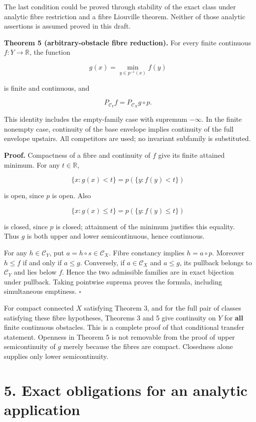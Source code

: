 \documentclass[
  11pt,
]{article}
\begin{document}
The last condition could be proved through stability of the exact class
under analytic fibre restriction and a fibre Liouville theorem. Neither
of those analytic assertions is assumed proved in this draft.

\textbf{Theorem 5 (arbitrary-obstacle fibre reduction).} For every
finite continuous \(f:Y\to\mathbb R\), the function

\[g(x)=\min_{y\in p^{-1}(x)}f(y)\]

is finite and continuous, and

\[P_{\mathcal C_Y}f=P_{\mathcal C_X}g\circ p.\]

This identity includes the empty-family case with supremum \(-\infty\).
In the finite nonempty case, continuity of the base envelope implies
continuity of the full envelope upstairs. All competitors are used; no
invariant subfamily is substituted.

\textbf{Proof.} Compactness of a fibre and continuity of \(f\) give its
finite attained minimum. For any \(t\in\mathbb R\),

\[\{x:g(x)<t\}=p(\{y:f(y)<t\})\]

is open, since \(p\) is open. Also

\[\{x:g(x)\leq t\}=p(\{y:f(y)\leq t\})\]

is closed, since \(p\) is closed; attainment of the minimum justifies
this equality. Thus \(g\) is both upper and lower semicontinuous, hence
continuous.

For any \(h\in\mathcal C_Y\), put \(a=h\circ s\in\mathcal C_X\). Fibre
constancy implies \(h=a\circ p\). Moreover \(h\leq f\) if and only if
\(a\leq g\). Conversely, if \(a\in\mathcal C_X\) and \(a\leq g\), its
pullback belongs to \(\mathcal C_Y\) and lies below \(f\). Hence the two
admissible families are in exact bijection under pullback. Taking
pointwise suprema proves the formula, including simultaneous emptiness.
\(\square\)

For compact connected \(X\) satisfying Theorem 3, and for the full pair
of classes satisfying these fibre hypotheses, Theorems 3 and 5 give
continuity on \(Y\) for \textbf{all} finite continuous obstacles. This
is a complete proof of that conditional transfer statement. Openness in
Theorem 5 is not removable from the proof of upper semicontinuity of
\(g\) merely because the fibres are compact. Closedness alone supplies
only lower semicontinuity.

\section{5. Exact obligations for an analytic
application}\label{exact-obligations-for-an-analytic-application}
\end{document}
